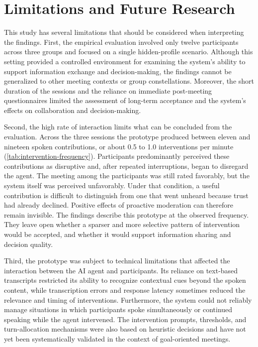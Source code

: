 \section{Limitations and Future Research}

This study has several limitations that should be considered when interpreting the findings. First, the
empirical evaluation involved only twelve participants across three groups and focused on a single
hidden-profile scenario. Although this setting provided a controlled environment for examining the system's
ability to support information exchange and decision-making, the findings cannot be generalized to other
meeting contexts or group constellations. Moreover, the short duration of the sessions and the reliance on
immediate post-meeting questionnaires limited the assessment of long-term acceptance and the system's effects
on collaboration and decision-making.

Second, the high rate of interaction limits what can be concluded from the evaluation. Across the three
sessions the prototype produced between eleven and nineteen spoken contributions, or about 0.5 to 1.0
interventions per minute (\autoref{tab:intervention-frequency}). Participants predominantly perceived these
contributions as disruptive and, after repeated interruptions, began to disregard the agent. The meeting
among the participants was still rated favorably, but the system itself was perceived unfavorably. Under
that condition, a useful contribution is difficult to distinguish from one that went unheard because trust
had already declined. Positive effects of proactive moderation can therefore remain invisible. The findings
describe this prototype at the observed frequency. They leave open whether a sparser and more selective
pattern of intervention would be accepted, and whether it would support information sharing and decision
quality.

Third, the prototype was subject to technical limitations that affected the interaction between the AI agent
and participants. Its reliance on text-based transcripts restricted its ability to recognize contextual cues
beyond the spoken content, while transcription errors and response latency sometimes reduced the relevance
and timing of interventions. Furthermore, the system could not reliably manage situations in which
participants spoke simultaneously or continued speaking while the agent intervened. The intervention prompts,
thresholds, and turn-allocation mechanisms were also based on heuristic decisions and have not yet been
systematically validated in the context of goal-oriented meetings.

